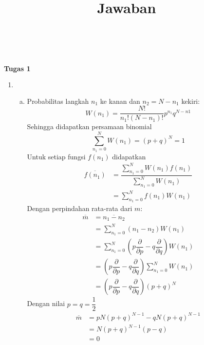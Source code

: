 \title{\centering\Large{{\textbf{Jawaban}}}}\\\\
\textbf{Tugas 1}
\begin{enumerate}
    \item 
    \begin{enumerate}[(a)]
        \item 
        Probabilitas langkah $n_1$ ke kanan dan $n_2=N-n_1$ kekiri:
        \begin{equation*}
            W(n_1)=\dfrac{N!}{n_1!(N-n_1)!}p^{n_1}q^{N-n1}
        \end{equation*}
        Sehingga didapatkan persamaan binomial
        \begin{equation*}
            \sum_{n_1=0}^N W(n_1)=(p+q)^N =1
        \end{equation*}
        Untuk setiap fungsi $f(n_1)$ didapatkan
        \begin{equation*}
            \begin{split}
                \overline{f(n_1)}&=\dfrac{\sum_{n_1=0}^N W(n_1)f(n_1)}{\sum_{n_1=0}^N W(n_1)}\\
                &=\sum_{n_1=0}^N f(n_1)W(n_1)
            \end{split}
        \end{equation*}
        Dengan perpindahan rata-rata dari $m$:
        \begin{equation*}
            \begin{split}
                \overline{m}&=\overline{n_1-n_2}\\
                &=\sum_{n_1=0}^N (n_1-n_2)W(n_1)\\
                &=\sum_{n_1=0}^N\left(p\dfrac{\partial}{\partial p} -q \dfrac{\partial}{\partial q}\right)W(n_1)\\
                &=\left(p\dfrac{\partial}{\partial p} -q \dfrac{\partial}{\partial q}\right)\sum_{n_1=0}^N W(n_1)\\
                &=\left(p\dfrac{\partial}{\partial p} -q \dfrac{\partial}{\partial q}\right)(p+q)^N
            \end{split}
        \end{equation*}
        Dengan nilai $p=q=\dfrac{1}{2}$
        \begin{equation*}
            \begin{split}
                \overline{m}&=pN(p+q)^{N-1}-qN(p+q)^{N-1}\\
                &=N(p+q)^{N-1}(p-q)\\
                &=0

\end{split}
\end{equation*}
\end{enumerate}
\end{enumerate}
